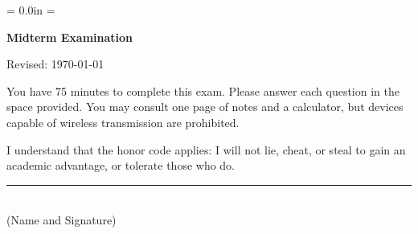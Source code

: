 \documentclass[letterpaper,12pt]{exam}
\def\HeadName{Midterm Examination}
\begin{document}
\parindent = 0.0in
\parskip = \bigskipamount
\thispagestyle{empty}%
\Head

\centerline{\large \bf \HeadName}%
\centerline{Revised:  \today}

\bigskip
You have 75 minutes to complete this exam.  Please answer each
question in the space provided. You may consult one page of notes
and a calculator, but devices capable of wireless transmission are
prohibited.

I understand that the honor code applies: I will not lie, cheat,
or steal to gain an academic advantage, or tolerate those who do.

\begin{flushright}
\rule{4in}{0.5pt} \\ (Name and Signature)
\end{flushright}

\end{document}
